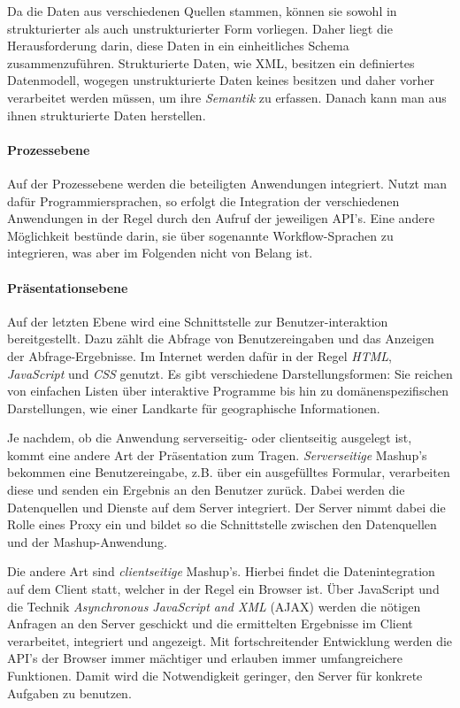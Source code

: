 \documentclass[11pt]{article}
\newcommand{\com}[1]{\marginpar{\em {\small{#1}}}} %
\begin{document}
\newpage 
\noindent
Da die Daten aus verschiedenen Quellen stammen, können sie sowohl in strukturierter als auch unstrukturierter Form vorliegen. Daher liegt die Herausforderung darin, diese Daten in ein einheitliches Schema zusammenzuführen. Strukturierte Daten, wie XML, besitzen ein definiertes Datenmodell, wogegen unstrukturierte Daten keines besitzen und daher vorher verarbeitet werden müssen, um ihre \textit{Semantik} zu erfassen. Danach kann man aus ihnen strukturierte Daten herstellen.


%
%
\paragraph{Prozessebene}

Auf der Prozessebene werden die beteiligten Anwendungen integriert. Nutzt man dafür Programmiersprachen, so erfolgt die Integration der verschiedenen Anwendungen in der Regel durch den Aufruf der jeweiligen API's. Eine andere Möglichkeit bestünde darin, sie über sogenannte Workflow-Sprachen zu integrieren, was aber im Folgenden nicht von Belang ist.

%
%
\paragraph{Präsentationsebene}

Auf der letzten Ebene wird eine Schnittstelle zur Benutzer-\mbox{interaktion} bereitgestellt. Dazu zählt die Abfrage von Benutzereingaben und das Anzeigen der Abfrage-Ergebnisse. Im Internet werden dafür in der Regel \textit{HTML}, \textit{JavaScript} und \textit{CSS} genutzt. Es gibt verschiedene Darstellungsformen: Sie reichen von einfachen Listen über interaktive Programme bis hin zu domänenspezifischen Darstellungen, wie einer Landkarte für geographische Informationen.

Je nachdem, ob die Anwendung serverseitig- oder clientseitig ausgelegt ist, kommt eine andere Art der Präsentation zum Tragen. \textit{Serverseitige} Mashup's\com{Serverseitig} bekommen eine Benutzereingabe, z.B. über ein ausgefülltes Formular, verarbeiten diese und senden ein Ergebnis an den Benutzer zurück. Dabei werden die Datenquellen und Dienste auf dem Server integriert. Der Server nimmt dabei die Rolle eines Proxy ein und bildet so die Schnittstelle zwischen den Datenquellen und der Mashup-Anwendung. 

Die andere Art sind \textit{clientseitige} Mashup's.\com{Clientseitig} Hierbei findet die Datenintegration auf dem Client statt, welcher in der Regel ein Browser ist. Über JavaScript und die Technik \textit{Asynchronous JavaScript and XML} (AJAX)\cite{AJAX} werden die nötigen Anfragen an den Server geschickt und die ermittelten Ergebnisse im Client verarbeitet, integriert und angezeigt. Mit fortschreitender Entwicklung werden die API's der Browser immer mächtiger und erlauben immer umfangreichere Funktionen. Damit wird die Notwendigkeit geringer, den Server für konkrete Aufgaben zu benutzen. 
\end{document}
